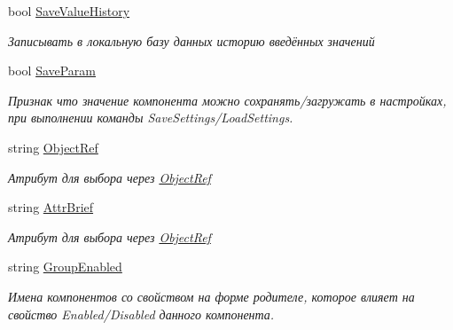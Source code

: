 \begin{DoxyCompactItemize}
bool \mbox{\hyperlink{class_f_b_a_1_1_text_box_f_b_a_aad10bd5584b4d7a24ff085ddc8d08c80}{Save\+Value\+History}}
\begin{DoxyCompactList}\small\item\em Записывать в локальную базу данных историю введённых значений \end{DoxyCompactList}\item 
bool \mbox{\hyperlink{class_f_b_a_1_1_text_box_f_b_a_a6e04daf5131d3b46e276881c772239bd}{Save\+Param}}
\begin{DoxyCompactList}\small\item\em Признак что значение компонента можно сохранять/загружать в настройках, при выполнении команды Save\+Settings/\+Load\+Settings. ~\newline
\end{DoxyCompactList}\item 
string \mbox{\hyperlink{class_f_b_a_1_1_text_box_f_b_a_a9921f25386256a45ff74c7975d74a935}{Object\+Ref}}
\begin{DoxyCompactList}\small\item\em Атрибут для выбора через \mbox{\hyperlink{class_f_b_a_1_1_object_ref}{Object\+Ref}} \end{DoxyCompactList}\item 
string \mbox{\hyperlink{class_f_b_a_1_1_text_box_f_b_a_a664835766a41c403bdbd1ef6a4252c36}{Attr\+Brief}}
\begin{DoxyCompactList}\small\item\em Атрибут для выбора через \mbox{\hyperlink{class_f_b_a_1_1_object_ref}{Object\+Ref}} \end{DoxyCompactList}\item 
string \mbox{\hyperlink{class_f_b_a_1_1_text_box_f_b_a_a45be7399cf634ce466b896b5bdaa5209}{Group\+Enabled}}
\begin{DoxyCompactList}\small\item\em Имена компонентов со свойством на форме родителе, которое влияет на свойство Enabled/\+Disabled данного компонента. \end{DoxyCompactList}\item 

\end{DoxyCompactItemize}
